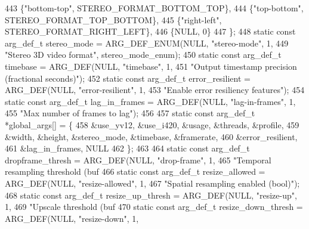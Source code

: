 \begin{DoxyCodeInclude}
{{443   \{\textcolor{stringliteral}{"bottom-top"}, STEREO\_FORMAT\_BOTTOM\_TOP\},
444   \{\textcolor{stringliteral}{"top-bottom"}, STEREO\_FORMAT\_TOP\_BOTTOM\},
445   \{\textcolor{stringliteral}{"right-left"}, STEREO\_FORMAT\_RIGHT\_LEFT\},
446   \{NULL, 0\}
447 \};
448 \textcolor{keyword}{static} \textcolor{keyword}{const} arg\_def\_t stereo\_mode      = ARG\_DEF\_ENUM(NULL, \textcolor{stringliteral}{"stereo-mode"}, 1,
449                                                        \textcolor{stringliteral}{"Stereo 3D video format"}, stereo\_mode\_enum);
450 \textcolor{keyword}{static} \textcolor{keyword}{const} arg\_def\_t timebase         = ARG\_DEF(NULL, \textcolor{stringliteral}{"timebase"}, 1,
451                                                   \textcolor{stringliteral}{"Output timestamp precision (fractional seconds)"});
452 \textcolor{keyword}{static} \textcolor{keyword}{const} arg\_def\_t error\_resilient  = ARG\_DEF(NULL, \textcolor{stringliteral}{"error-resilient"}, 1,
453                                                   \textcolor{stringliteral}{"Enable error resiliency features"});
454 \textcolor{keyword}{static} \textcolor{keyword}{const} arg\_def\_t lag\_in\_frames    = ARG\_DEF(NULL, \textcolor{stringliteral}{"lag-in-frames"}, 1,
455                                                   \textcolor{stringliteral}{"Max number of frames to lag"});
456 
457 \textcolor{keyword}{static} \textcolor{keyword}{const} arg\_def\_t *global\_args[] = \{
458   &use\_yv12, &use\_i420, &usage, &threads, &profile,
459   &width, &height, &stereo\_mode, &timebase, &framerate,
460   &error\_resilient,
461   &lag\_in\_frames, NULL
462 \};
463 
464 \textcolor{keyword}{static} \textcolor{keyword}{const} arg\_def\_t dropframe\_thresh   = ARG\_DEF(NULL, \textcolor{stringliteral}{"drop-frame"}, 1,
465                                                     \textcolor{stringliteral}{"Temporal resampling threshold (buf %
466 \textcolor{keyword}{static} \textcolor{keyword}{const} arg\_def\_t resize\_allowed     = ARG\_DEF(NULL, \textcolor{stringliteral}{"resize-allowed"}, 1,
467                                                     \textcolor{stringliteral}{"Spatial resampling enabled (bool)"});
468 \textcolor{keyword}{static} \textcolor{keyword}{const} arg\_def\_t resize\_up\_thresh   = ARG\_DEF(NULL, \textcolor{stringliteral}{"resize-up"}, 1,
469                                                     \textcolor{stringliteral}{"Upscale threshold (buf %
470 \textcolor{keyword}{static} \textcolor{keyword}{const} arg\_def\_t resize\_down\_thresh = ARG\_DEF(NULL, \textcolor{stringliteral}{"resize-down"}, 1,
}}}}
\end{DoxyCodeInclude}
